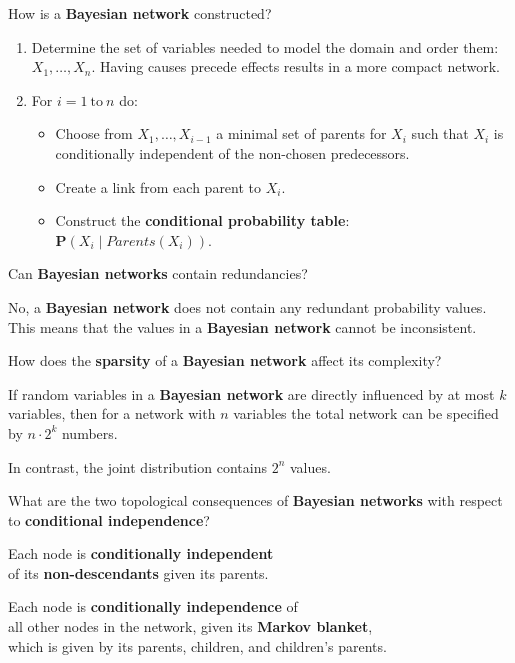 \begin{flashcard}[Question]{How is a \textbf{Bayesian network} constructed?}
\begin{enumerate}[label=\arabic*.]
\item Determine the set of variables needed to model the domain and order them: ${X_1, \ldots, X_n}$. Having causes precede effects results in a more compact network.
\item For $i = 1~\text{to}~n$ do:
\begin{itemize}
\item Choose from $X_1, \ldots, X_{i - 1}$ a minimal set of parents for $X_i$ such that $X_i$ is conditionally independent of the non-chosen predecessors.
\item Create a link from each parent to $X_i$.
\item Construct the \textbf{conditional probability table}:\\$\mathbf{P}(X_i \mid \textit{Parents}(X_i))$.
\end{itemize}
\end{enumerate}
\end{flashcard}

\begin{flashcard}[Question]{Can \textbf{Bayesian networks} contain redundancies?}
\begin{center}
No, a \textbf{Bayesian network} does not contain any redundant probability values. This means that the values in a \textbf{Bayesian network} cannot be inconsistent.
\end{center}
\end{flashcard}

\begin{flashcard}[Question]{How does the \textbf{sparsity} of a \textbf{Bayesian network} affect its complexity?}
\begin{center}
If random variables in a \textbf{Bayesian network} are directly influenced by at most $k$ variables, then for a network with $n$ variables the total network can be specified by $n \cdot 2^k$ numbers.

\medskip

In contrast, the joint distribution contains $2^n$ values.
\end{center}
\end{flashcard}

\begin{flashcard}[Question]{What are the two topological consequences of \textbf{Bayesian networks} with respect to \textbf{conditional independence}?}
\begin{center}
Each node is \textbf{conditionally independent}\\of its \textbf{non-descendants} given its parents.

\medskip

Each node is \textbf{conditionally independence} of\\all other nodes in the network, given its \textbf{Markov blanket},\\which is given by its parents, children, and children's parents.
\end{center}
\end{flashcard}

